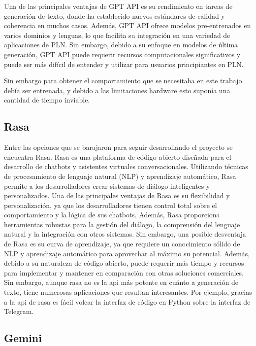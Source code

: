 Una de las principales ventajas de GPT API es su rendimiento en tareas de generación de texto, donde ha establecido nuevos estándares de calidad y coherencia en muchos casos. Además, GPT API ofrece modelos pre-entrenados en varios dominios y lenguas, lo que facilita su integración en una variedad de aplicaciones de PLN. Sin embargo, debido a su enfoque en modelos de última generación, GPT API puede requerir recursos computacionales significativos y puede ser más difícil de entender y utilizar para usuarios principiantes en PLN.

Sin embargo para obtener el comportamiento que se necesitaba en este trabajo debía ser entrenada, y debido a las limitaciones hardware esto suponía una cantidad de tiempo inviable. 

\subsection{Rasa}
Entre las opciones que se barajaron para seguir desarrollando el proyecto se encuentra Rasa. Rasa es una plataforma de código abierto diseñada para el desarrollo de chatbots y asistentes virtuales conversacionales. Utilizando técnicas de procesamiento de lenguaje natural (NLP) y aprendizaje automático, Rasa permite a los desarrolladores crear sistemas de diálogo inteligentes y personalizados. Una de las principales ventajas de Rasa es su flexibilidad y personalización, ya que los desarrolladores tienen control total sobre el comportamiento y la lógica de sus chatbots. Además, Rasa proporciona herramientas robustas para la gestión del diálogo, la comprensión del lenguaje natural y la integración con otros sistemas. Sin embargo, una posible desventaja de Rasa es su curva de aprendizaje, ya que requiere un conocimiento sólido de NLP y aprendizaje automático para aprovechar al máximo su potencial. Además, debido a su naturaleza de código abierto, puede requerir más tiempo y recursos para implementar y mantener en comparación con otras soluciones comerciales. Sin embargo, aunque rasa no es la api más potente en cuánto a generación de texto, tiene numerosas aplicaciones que resultan interesantes. Por ejemplo, gracias a la api de rasa es fácil volcar la interfaz de código en Python sobre la interfaz de Telegram. 

\subsection{Gemini}


